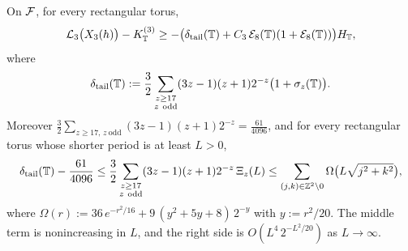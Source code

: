 \begin{proposition}\label{prop:three}
On $\mathcal{F}$, for every rectangular torus,
\[
\mathcal{L}_3\bigl(X_3(h)\bigr)-K_{\mathbb{T}}^{(3)}\ge-\bigl(\delta_{\mathrm{tail}}(\mathbb{T})+C_{3}\,\mathcal{E}_8(\mathbb{T})(1+\mathcal{E}_8(\mathbb{T}))\bigr)H_{\mathbb{T}},
\]
where
\[
\dtail(\Tor):=\frac32\sum_{\substack{z\ge17\\ z\ \mathrm{odd}}}(3z-1)(z+1)2^{-z}\bigl(1+\sigma_z(\Tor)\bigr).
\]
Moreover $\frac32\sum_{z\ge17,\,z\ \mathrm{odd}}(3z-1)(z+1)2^{-z}=\frac{61}{4096}$, and for every rectangular torus whose shorter period
is at least $L>0$,
\[
\delta_{\mathrm{tail}}(\mathbb{T})-\frac{61}{4096}\le\frac32\sum_{\substack{z\ge17\\ z\ \mathrm{odd}}}(3z-1)(z+1)2^{-z}\,\Xi_z(L)
\le\sum_{(j,k)\in\mathbb{Z}^2\setminus0}\Omega\bigl(L\sqrt{j^2+k^2}\bigr),
\]
where $\Omega(r):=36\,e^{-r^2/16}+9\,(y^2+5y+8)\,2^{-y}$ with $y:=r^2/20$. The middle term is nonincreasing in $L$, and the right
side is $O(L^4\,2^{-L^2/20})$ as $L\to\infty$.
\end{proposition}

